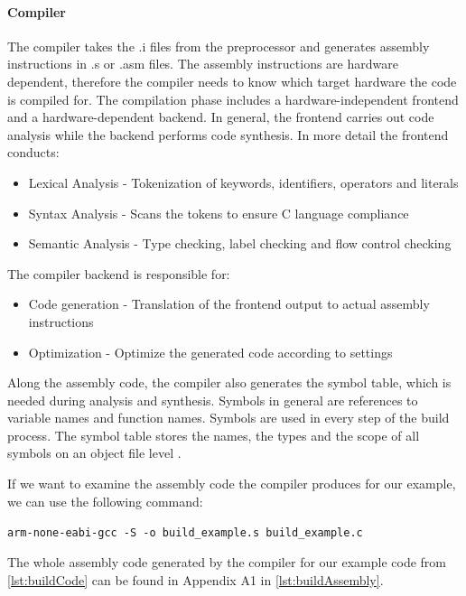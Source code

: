 \documentclass[a4paper,12pt]{article}
\newcommand{\inlinebash}[1]{\texttt{#1}}
\begin{document}
\paragraph{Compiler}\label{sec:compiler}
The compiler takes the .i files from the preprocessor and generates assembly instructions in .s or .asm files. The assembly instructions are hardware dependent, therefore the compiler needs to know which target hardware the code is compiled for. The compilation phase includes a hardware-independent frontend and a hardware-dependent backend. In general, the frontend carries out code analysis while the backend performs code synthesis. In more detail the frontend conducts:

\begin{itemize}
  \item Lexical Analysis - Tokenization of keywords, identifiers, operators and literals
  \item Syntax Analysis - Scans the tokens to ensure C language compliance
  \item Semantic Analysis - Type checking, label checking and flow control checking
\end{itemize}

The compiler backend is responsible for:

\begin{itemize}
  \item Code generation - Translation of the frontend output to actual assembly instructions
  \item Optimization - Optimize the generated code according to settings
\end{itemize}

Along the assembly code, the compiler also generates the symbol table, which is needed during analysis and synthesis. Symbols in general are references to variable names and function names. Symbols are used in every step of the build process. The symbol table stores the names, the types and the scope of all symbols on an object file level \cite{EmbeddedSecurity}\cite{TutorialsPoint}.\par

If we want to examine the assembly code the compiler produces for our example, we can use the following command:\newline

\inlinebash{arm-none-eabi-gcc -S -o build_example.s build_example.c}\newline

The whole assembly code generated by the compiler for our example code from \autoref{lst:buildCode} can be found in Appendix A1 in \autoref{lst:buildAssembly}.
\end{document}
